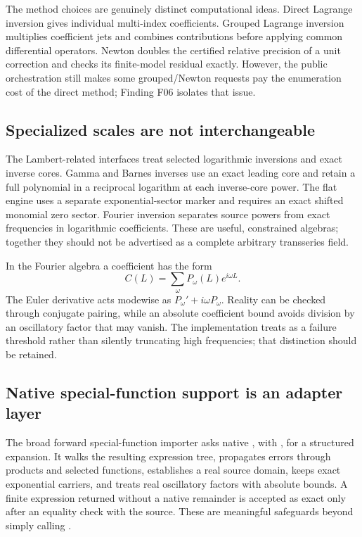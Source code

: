 \documentclass[11pt,letterpaper]{article}
\newcommand{\code}[1]{\texttt{\small\detokenize{#1}}}
\begin{document}
The method choices are genuinely distinct computational ideas. Direct Lagrange inversion gives individual multi-index coefficients. Grouped Lagrange inversion multiplies coefficient jets and combines contributions before applying common differential operators. Newton doubles the certified relative precision of a unit correction and checks its finite-model residual exactly. However, the public orchestration still makes some grouped/Newton requests pay the enumeration cost of the direct method; Finding F06 isolates that issue.\cite{repo-incremental,repo-core}

\subsection{Specialized scales are not interchangeable}
The Lambert-related interfaces treat selected logarithmic inversions and exact inverse cores. Gamma and Barnes inverses use an exact leading core and retain a full polynomial in a reciprocal logarithm at each inverse-core power. The flat engine uses a separate exponential-sector marker and requires an exact shifted monomial zero sector. Fourier inversion separates source powers from exact frequencies in logarithmic coefficients. These are useful, constrained algebras; together they should not be advertised as a complete arbitrary transseries field.\cite{repo-guide,repo-gamma,repo-flat,repo-fourier}

In the Fourier algebra a coefficient has the form
\[
 C(L)=\sum_\omega P_\omega(L)e^{i\omega L}.
\]
The Euler derivative acts modewise as $P_\omega' + i\omega P_\omega$. Reality can be checked through conjugate pairing, while an absolute coefficient bound avoids division by an oscillatory factor that may vanish. The implementation treats \code{MaxFrequencies} as a failure threshold rather than silently truncating high frequencies; that distinction should be retained.\cite{repo-fourier}

\subsection{Native special-function support is an adapter layer}
The broad forward special-function importer asks native \code{Series}, with \code{Analytic -> False}, for a structured expansion. It walks the resulting expression tree, propagates errors through products and selected functions, establishes a real source domain, keeps exact exponential carriers, and treats real oscillatory factors with absolute bounds. A finite expression returned without a native remainder is accepted as exact only after an equality check with the source. These are meaningful safeguards beyond simply calling \code{Normal[Series[...]]}.\cite{repo-native}
\end{document}
